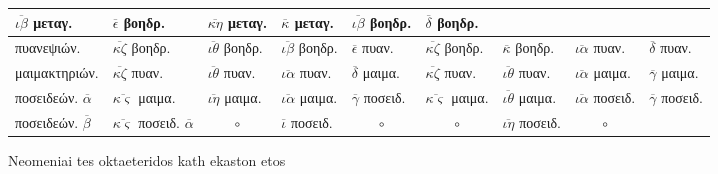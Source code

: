 \begin{tabular}{l llllllll}
$\overline{\iota\beta}$      \textgreek{μεταγ.} &
$\overline{\epsilon}$        \textgreek{βοηδρ.} &
$\overline{\kappa\eta}$      \textgreek{μεταγ.} &
$\overline{\kappa}$          \textgreek{μεταγ.} &
$\overline{\iota\beta}$      \textgreek{βοηδρ.} &
$\overline{\delta}$          \textgreek{βοηδρ.}
\\
\hline
\textgreek{πυανεψιών.} &
$\overline{\kappa\zeta}$     \textgreek{βοηδρ.} &
$\overline{\iota\theta}$     \textgreek{βοηδρ.} &
$\overline{\iota\beta}$      \textgreek{βοηδρ.} &
$\overline{\epsilon}$        \textgreek{πυαν.} &
$\overline{\kappa\zeta}$     \textgreek{βοηδρ.} &
$\overline{\kappa}$          \textgreek{βοηδρ.} &
$\overline{\iota\alpha}$     \textgreek{πυαν.} &
$\overline{\delta}$          \textgreek{πυαν.}
\\
\textgreek{μαιμακτηριών.} &
$\overline{\kappa\zeta}$     \textgreek{πυαν.} &
$\overline{\iota\theta}$     \textgreek{πυαν.} &
$\overline{\iota\alpha}$     \textgreek{πυαν.} &
$\overline{\delta}$          \textgreek{μαιμα.} &
$\overline{\kappa\zeta}$     \textgreek{πυαν.} &
$\overline{\iota\theta}$     \textgreek{πυαν.} &
$\overline{\iota\alpha}$     \textgreek{μαιμα.} &
$\overline{\gamma}$          \textgreek{μαιμα.}
\\
\textgreek{ποσειδεών.} $\overline{\alpha}$&
$\overline{\kappa\varsigma}$ \textgreek{μαιμα.} &
$\overline{\iota\eta}$       \textgreek{μαιμα.} &
$\overline{\iota\alpha}$     \textgreek{μαιμα.} &
$\overline{\gamma}$          \textgreek{ποσειδ.} &
$\overline{\kappa\varsigma}$ \textgreek{μαιμα.} &
$\overline{\iota\theta}$     \textgreek{μαιμα.} &
$\overline{\iota\alpha}$     \textgreek{ποσειδ.} &
$\overline{\gamma}$          \textgreek{ποσειδ.}
\\
\textgreek{ποσειδεών.} $\overline{\beta}$&
$\overline{\kappa\varsigma}$ \textgreek{ποσειδ.} $\overline{\alpha}$ &
    \multicolumn{1}{c}{$\circ$} &
$\overline{\iota}$           \textgreek{ποσειδ.} &
    \multicolumn{1}{c}{$\circ$} &
    \multicolumn{1}{c}{$\circ$} &
$\overline{\iota\eta}$       \textgreek{ποσειδ.} &
    \multicolumn{1}{c}{$\circ$} &
~
\\
\end{tabular}
%
\caption{Neomeniai tes oktaeteridos kath ekaston etos}